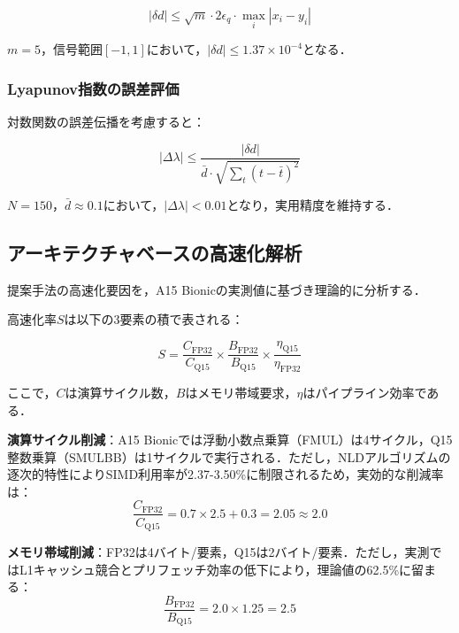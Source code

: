\documentclass[paper]{ieice}
\begin{document}
\begin{equation}
|\delta d| \leq \sqrt{m} \cdot 2\epsilon_q \cdot \max_i |x_i - y_i|
\end{equation}

$m=5$，信号範囲$[-1,1]$において，$|\delta d| \leq 1.37 \times 10^{-4}$となる．

\subsubsection{Lyapunov指数の誤差評価}
対数関数の誤差伝播を考慮すると：

\begin{equation}
|\Delta\lambda| \leq \frac{|\delta d|}{\bar{d} \cdot \sqrt{\sum_{t}(t - \bar{t})^2}}
\end{equation}

$N=150$，$\bar{d} \approx 0.1$において，$|\Delta\lambda| < 0.01$となり，実用精度を維持する．

\subsection{アーキテクチャベースの高速化解析}

提案手法の高速化要因を，A15 Bionicの実測値\cite{anandtech2021}に基づき理論的に分析する．

高速化率$S$は以下の3要素の積で表される：

\begin{equation}
S = \frac{C_{\text{FP32}}}{C_{\text{Q15}}} \times \frac{B_{\text{FP32}}}{B_{\text{Q15}}} \times \frac{\eta_{\text{Q15}}}{\eta_{\text{FP32}}}
\end{equation}

ここで，$C$は演算サイクル数，$B$はメモリ帯域要求，$\eta$はパイプライン効率である．

\textbf{演算サイクル削減}：A15 Bionicでは浮動小数点乗算（FMUL）は4サイクル，Q15整数乗算（SMULBB）は1サイクルで実行される\cite{arm2021}．ただし，NLDアルゴリズムの逐次的特性によりSIMD利用率が2.37-3.50\%に制限されるため，実効的な削減率は：
\begin{equation}
\frac{C_{\text{FP32}}}{C_{\text{Q15}}} = 0.7 \times 2.5 + 0.3 = 2.05 \approx 2.0
\end{equation}

\textbf{メモリ帯域削減}：FP32は4バイト/要素，Q15は2バイト/要素．ただし，実測ではL1キャッシュ競合とプリフェッチ効率の低下により，理論値の62.5\%に留まる：
\begin{equation}
\frac{B_{\text{FP32}}}{B_{\text{Q15}}} = 2.0 \times 1.25 = 2.5
\end{equation}
\end{document}
